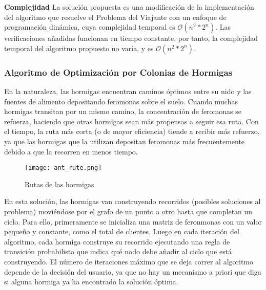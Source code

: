 \documentclass[twocolumn, fontsize=10pt]{article}
\begin{document}
\textbf{Complejidad}
La solución propuesta es una modificación de la implementación del algoritmo que resuelve el Problema del Viajante con un enfoque de programación dinámica, cuya complejidad temporal es \(\mathcal{O}(n^2*2^n)\). Las verificaciones añadidas funcionan en tiempo constante, por tanto, la complejidad temporal del algoritmo propuesto no varía, y es \(\mathcal{O}(n^2*2^n)\). 

\subsubsection{Algoritmo de Optimización por Colonias de Hormigas}

En la naturaleza, las hormigas encuentran caminos óptimos entre su nido y las fuentes de alimento depositando feromonas sobre el suelo. Cuando muchas hormigas transitan por un mismo camino, la concentración de feromonas se refuerza, haciendo que otras hormigas sean más propensas a seguir esa ruta. Con el tiempo, la ruta más corta (o de mayor eficiencia) tiende a recibir más refuerzo, ya que las hormigas que la utilizan depositan feromonas más frecuentemente debido a que la recorren en menos tiempo.

\begin{figure}[h]
    \centering
    \texttt{[image: ant\_rute.png]}
    \caption{Rutas de las hormigas}
    \label{fig:gadget}
\end{figure}

 En esta solución, las hormigas van construyendo recorridos (posibles soluciones al problema) moviéndose por el grafo de un punto a otro hasta que completan un ciclo. Para ello, primeramente se inicializa una matriz de feronmonas con un valor pequeño y constante, como el total de  clientes. Luego en cada iteración del algoritmo, cada hormiga construye su recorrido ejecutando una regla de transición probabilista que indica qué nodo debe añadir al ciclo que está construyendo. El número de iteraciones máximo que se deja correr al algoritmo depende de la decisión del usuario, ya que no hay un mecanismo a priori que diga si alguna hormiga ya ha encontrado la solución óptima. \cite{ant}
\end{document}

